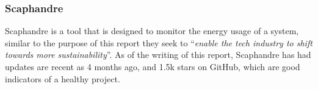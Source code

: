 \subsubsection{Scaphandre}
Scaphandre\cite{Scaphandre} is a tool that is designed to monitor the energy usage of a system, similar to the purpose
of this report they seek to ``\textit{enable the tech industry to shift towards more sustainability}''.
As of the writing of this report, Scaphandre has had updates are recent as 4 months ago, and 1.5k stars on GitHub, which
are good indicators of a healthy project.
